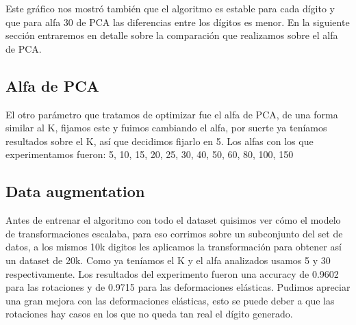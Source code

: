 Este gráfico nos mostró también que el algoritmo es estable para cada dígito y que para alfa 30 de PCA las diferencias entre los dígitos es menor. En la siguiente sección entraremos en detalle sobre la comparación que realizamos sobre el alfa de PCA.

\subsection{Alfa de PCA}

El otro parámetro que tratamos de optimizar fue el alfa de PCA, de una forma similar al K, fijamos este y fuimos cambiando el alfa, por suerte ya teníamos resultados sobre el K, así que decidimos fijarlo en 5. Los alfas con los que experimentamos fueron: 5, 10, 15, 20, 25, 30, 40, 50, 60, 80, 100, 150


\subsection{Data augmentation}

Antes de entrenar el algoritmo con todo el dataset quisimos ver cómo el modelo de transformaciones escalaba, para eso corrimos sobre un subconjunto del set de datos, a los mismos 10k digitos les aplicamos la transformación para obtener así un dataset de 20k. Como ya teníamos el K y el alfa analizados usamos 5 y 30 respectivamente. Los resultados del experimento fueron una accuracy de 0.9602 para las rotaciones y de 0.9715 para las deformaciones elásticas. Pudimos apreciar una gran mejora con las deformaciones elásticas, esto se puede deber a que las rotaciones hay casos en los que no queda tan real el dígito generado.